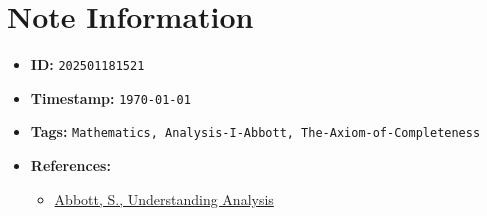 \clearpage
{}
\label{202501181521}
\renewcommand{\notetitle}{Additional Review}

\section*{Note Information}
\begin{itemize}
  \item \textbf{ID:} \texttt{202501181521}
  \item \textbf{Timestamp:} \texttt{\today \ \currenttime}
  \item \textbf{Tags:} \texttt{Mathematics, Analysis-I-Abbott, The-Axiom-of-Completeness}
  \item \textbf{References:}
    \begin{itemize}
      \item \href{/home/garrett/Personal/References/Mathematics/Analysis-I/Abbott.pdf}{Abbott, S., Understanding Analysis}
    \end{itemize}
\end{itemize}


